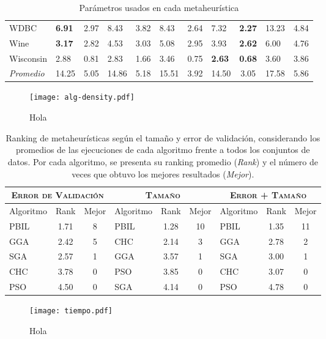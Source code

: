\begin{table}[h!]
\begin{tabular}{l g c g c g c g c g c}
WDBC         & \textbf{6.91} &  2.97 &  8.43 & 3.82 &  8.43 & 2.64 &  7.32 & \textbf{2.27} & 13.23 &  4.84 \\
Wine         & \textbf{3.17} &  2.82 &  4.53 & 3.03 &  5.08 & 2.95 &  3.93 & \textbf{2.62} &  6.00 &  4.76 \\
Wisconsin    &  2.88 &  0.81 &  2.83 & 1.66 &  3.46 & 0.75 & \textbf{2.63} & \textbf{0.68} &  3.60 &  3.86 \\
\hline
\emph{Promedio} & 14.25 & 5.05 & 14.86 & 5.18 & 15.51 & 3.92 & 14.50 & 3.05 & 17.58 & 5.86\\
\hline
\end{tabular}
\caption{Parámetros usados en cada metaheurística}
\label{res-all}
\end{table}

\begin{figure}[h!]
\centering
\texttt{[image: alg-density.pdf]}
\caption{Hola}
\label{fig-alg-density}
\end{figure}

\begin{table}[h!]
\centering
\begin{tabular}{l c c|l c c|l c c}
\hline
\multicolumn{3}{c|}{\textsc{Error de Validación}}
	& \multicolumn{3}{c|}{\textsc{Tamaño}}
	& \multicolumn{3}{c}{\textsc{Error + Tamaño}} \\
\hline
Algoritmo & Rank & Mejor & Algoritmo & Rank & Mejor & Algoritmo & Rank & Mejor \\
\hline
\hline
PBIL & 1.71 & 8 & PBIL & 1.28 & 10 & PBIL & 1.35 & 11 \\
GGA  & 2.42 & 5 & CHC  & 2.14 &  3 & GGA  & 2.78 &  2 \\
SGA  & 2.57 & 1 & GGA  & 3.57 &  1 & SGA  & 3.00 &  1 \\
CHC  & 3.78 & 0 & PSO  & 3.85 &  0 & CHC  & 3.07 &  0 \\
PSO  & 4.50 & 0 & SGA  & 4.14 &  0 & PSO  & 4.78 &  0 \\
\hline
\end{tabular}
\caption[Ranking de metaheurísticas según el tamaño y error de validación en conjuntos de datos grandes]{Ranking de metaheurísticas según el tamaño y error de validación, considerando los promedios de las ejecuciones de cada algoritmo frente a todos los conjuntos de datos. Por cada algoritmo, se presenta su ranking promedio (\emph{Rank}) y el número de veces que obtuvo los mejores resultados (\emph{Mejor}).}
\label{res-all-rank}
\end{table}

\begin{figure}[h!]
\centering
\texttt{[image: tiempo.pdf]}
\caption{Hola}
\label{fig-tiempo}
\end{figure}
